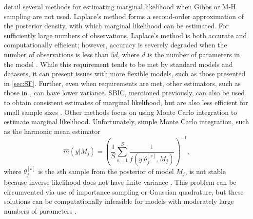 \documentclass[twocolumn]{article}
\begin{document}
\cite{KassRaftery} detail several methods for estimating marginal likelihood when Gibbs or M-H sampling are not used. Laplace's method forms a second-order approximation of the posterior density, with which marginal likelihood can be estimated. For sufficiently large numbers of observations, Laplace's method is both accurate and computationally efficient; however, accuracy is severely degraded when the number of observations is less than $5d$, where $d$ is the number of parameters in the model \citep{Slate}. While this requirement tends to be met by standard models and datasets, it can present issues with more flexible models, such as those presented in \cref{sec:SF}. Further, even when requirements are met, other estimators, such as those in \cite{Chib}, can have lower variance. SBIC, mentioned previously, can also be used to obtain consistent estimates of marginal likelihood, but are also less efficient for small sample sizes \cite{Bollen}. Other methods focus on using Monte Carlo integration to estimate marginal likelihood. Unfortunately, simple Monte Carlo integration, such as the harmonic mean estimator
\begin{equation}
	\hat{m}(y|M_j) = \left(\frac{1}{S} \sum_{s=1}^S \frac{1}{f(y|\theta_j^{[s]}, M_j)}\right)^{-1},
\end{equation}
where $\theta_j^{[s]}$ is the $s$th sample from the posterior of model $M_j$, is not stable because inverse likelihood does not have finite variance \citep{NewtonRaferty}. This problem can be circumvented via use of importance sampling or Gaussian quadrature, but these solutions can be computationally infeasible for models with moderately large numbers of parameters \citep{GenzKass}.
\end{document}
